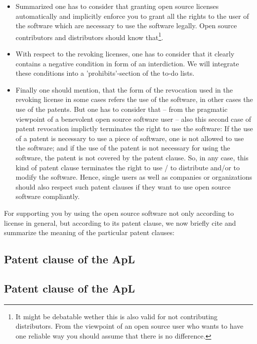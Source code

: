 \begin{itemize}
  \item Summarized one has to consider that granting open source licenses
  automatically and implicitly enforce you to grant all the rights to the user
  of the software which are necessary to use the software legally. Open source
  contributors and distributors should know that\footnote{It might be debatable
  wether this is also valid for not contributing distributors. From the
  viewpoint of an open source user who wants to have one reliable way you should
  assume that there is no difference.}.

  \item With respect to the revoking licenses, one has to consider that it
  clearly contains a negative condition in form of an interdiction. We will
  integrate these conditions into a 'prohibits'-section of the to-do lists.
  
  \item Finally one should mention, that the form of the revocation used in the
  revoking license in some cases refers the use of the software, in other cases
  the use of the patents. But one has to consider that -- from the pragmatic
  viewpoint of a benevolent open source software user -- also this second case
  of patent revocation implictly terminates the right to use the software: If
  the use of a patent is necessary to use a piece of software, one is not
  allowed to use the software; and if the use of the patent is not necessary for
  using the software, the patent is not covered by the patent clause. So, in any
  case, this kind of patent clause terminates the right to use / to distribute
  and/or to modify the software. Hence, single users as well as companies or
  organizations should also respect such patent clauses if they want to use open
  source software compliantly.
\end{itemize}

For supporting you by using the open source software not only according to
license in general, but according to its patent clause, we now briefly cite and
summarize the meaning of the particular patent clauses:

\subsection{Patent clause of the ApL}

\subsection{Patent clause of the ApL}

